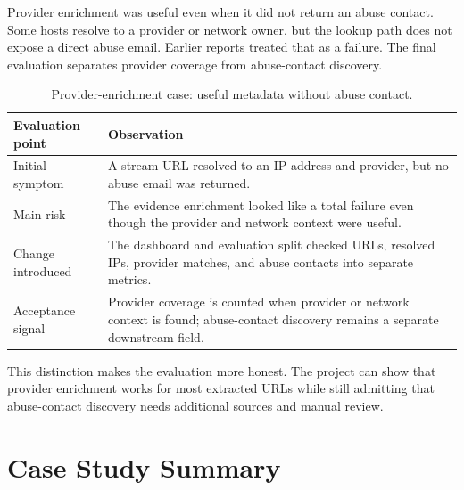 Provider enrichment was useful even when it did not return an abuse contact.
Some hosts resolve to a provider or network owner, but the lookup path does not
expose a direct abuse email. Earlier reports treated that as a failure. The
final evaluation separates provider coverage from abuse-contact discovery.

\begin{table}[!htbp]
\centering
\begin{tabularx}{\textwidth}{Q{3.8cm}Y}
\toprule
{}
Evaluation point & Observation \\
\midrule
Initial symptom & A stream URL resolved to an IP address and provider, but no
abuse email was returned. \\
Main risk & The evidence enrichment looked like a total failure even though the
provider and network context were useful. \\
Change introduced & The dashboard and evaluation split checked URLs, resolved
IPs, provider matches, and abuse contacts into separate metrics. \\
Acceptance signal & Provider coverage is counted when provider or network
context is found; abuse-contact discovery remains a separate downstream field. \\
\bottomrule
\end{tabularx}
\caption{Provider-enrichment case: useful metadata without abuse contact.}
\label{tab:case-provider-no-abuse}
\end{table}

This distinction makes the evaluation more honest. The project can show that
provider enrichment works for most extracted URLs while still admitting that
abuse-contact discovery needs additional sources and manual review.

\section{Case Study Summary}


